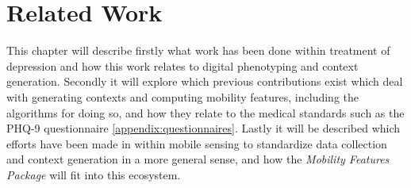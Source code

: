 \chapter{Related Work}

This chapter will describe firstly what work has been done within treatment of depression and how this work relates to digital phenotyping and context generation. Secondly it will explore which previous contributions exist which deal with generating contexts and computing mobility features, including the algorithms for doing so, and how they relate to the medical standards such as the PHQ-9 questionnaire \ref{appendix:questionnaires}. Lastly it will be described which efforts have been made in within mobile sensing to standardize data collection and context generation in a more general sense, and how the \textit{Mobility Features Package} will fit into this ecosystem.

% 













